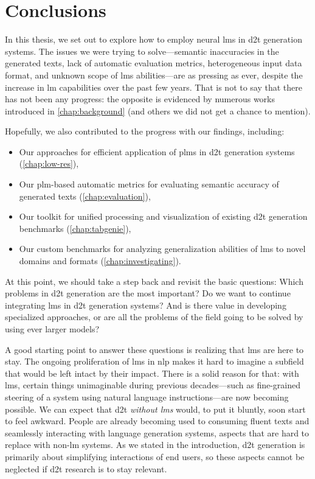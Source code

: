 
\chapter{Conclusions}
\label{chap:conclusions}

In this thesis, we set out to explore how to employ neural \acp{lm} in \ac{d2t} generation systems. The issues we were trying to solve---semantic inaccuracies in the generated texts, lack of automatic evaluation metrics, heterogeneous input data format, and unknown scope of \acp{lm} abilities---are as pressing as ever, despite the increase in \ac{lm} capabilities over the past few years. That is not to say that there has not been any progress: the opposite is evidenced by numerous works introduced in \autoref{chap:background} (and others we did not get a chance to mention).


Hopefully, we also contributed to the progress with our findings, including:
\begin{itemize}
    \item Our approaches for efficient application of \acp{plm} in \ac{d2t} generation systems (\autoref{chap:low-res}),
    \item Our \ac{plm}-based automatic metrics for evaluating semantic accuracy of generated texts (\autoref{chap:evaluation}),
    \item Our toolkit for unified processing and visualization of existing \ac{d2t} generation benchmarks (\autoref{chap:tabgenie}),
    \item Our custom benchmarks for analyzing generalization abilities of \acp{lm} to novel domains and formats (\autoref{chap:investigating}).
\end{itemize}

At this point, we should take a step back and revisit the basic questions: Which problems in \ac{d2t} generation are the most important? Do we want to continue integrating \aclp{lm} in \ac{d2t} generation systems? And is there value in developing specialized approaches, or are all the problems of the field going to be solved by using ever larger models?

A good starting point to answer these questions is realizing that \aclp{lm} are here to stay. The ongoing proliferation of \acp{lm} in \acl{nlp} \cite{min2023recent,zhao2023survey,naveed2024comprehensive} makes it hard to imagine a subfield that would be left intact by their impact. There is a solid reason for that: with \acp{lm}, certain things unimaginable during previous decades---such as fine-grained steering of a system using natural language instructions---are now becoming possible. We can expect that \ac{d2t} \emph{without \acp{lm}} would, to put it bluntly, soon start to feel awkward. People are already becoming used to consuming fluent texts and seamlessly interacting with language generation systems, aspects that are hard to replace with non-\ac{lm} systems. As we stated in the introduction, \ac{d2t} generation is primarily about simplifying interactions of end users, so these aspects cannot be neglected if \ac{d2t} research is to stay relevant.

